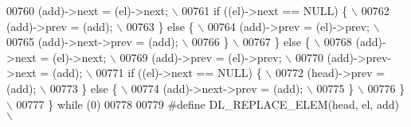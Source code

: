 \begin{DoxyCode}
00760 \textcolor{preprocessor}{  (add)->next = (el)->next;                                                                    \(\backslash\)}
00761 \textcolor{preprocessor}{  if ((el)->next == NULL) \{                                                                    \(\backslash\)}
00762 \textcolor{preprocessor}{   (add)->prev = (add);                                                                        \(\backslash\)}
00763 \textcolor{preprocessor}{  \} else \{                                                                                     \(\backslash\)}
00764 \textcolor{preprocessor}{   (add)->prev = (el)->prev;                                                                   \(\backslash\)}
00765 \textcolor{preprocessor}{   (add)->next->prev = (add);                                                                  \(\backslash\)}
00766 \textcolor{preprocessor}{  \}                                                                                            \(\backslash\)}
00767 \textcolor{preprocessor}{ \} else \{                                                                                      \(\backslash\)}
00768 \textcolor{preprocessor}{  (add)->next = (el)->next;                                                                    \(\backslash\)}
00769 \textcolor{preprocessor}{  (add)->prev = (el)->prev;                                                                    \(\backslash\)}
00770 \textcolor{preprocessor}{  (add)->prev->next = (add);                                                                   \(\backslash\)}
00771 \textcolor{preprocessor}{  if ((el)->next == NULL) \{                                                                    \(\backslash\)}
00772 \textcolor{preprocessor}{   (head)->prev = (add);                                                                       \(\backslash\)}
00773 \textcolor{preprocessor}{  \} else \{                                                                                     \(\backslash\)}
00774 \textcolor{preprocessor}{   (add)->next->prev = (add);                                                                  \(\backslash\)}
00775 \textcolor{preprocessor}{  \}                                                                                            \(\backslash\)}
00776 \textcolor{preprocessor}{ \}                                                                                             \(\backslash\)}
00777 \textcolor{preprocessor}{\} while (0)}
00778 
00779 \textcolor{preprocessor}{#define DL\_REPLACE\_ELEM(head, el, add)                                                         \(\backslash\)}

\end{DoxyCode}
